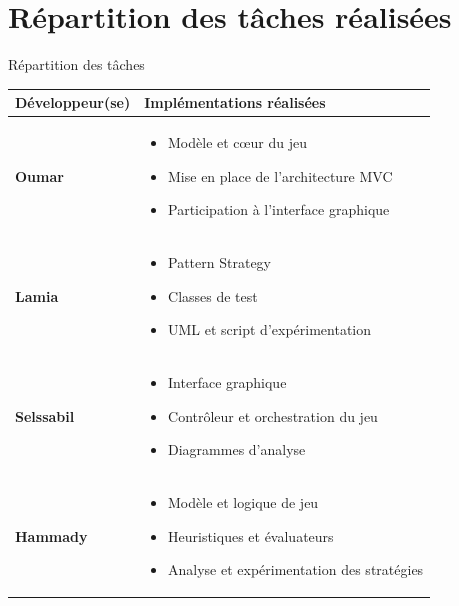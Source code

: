 \documentclass[10pt]{beamer}
\begin{document}
\section{Répartition des tâches réalisées}
\begin{frame}{Répartition des tâches}
\centering
\renewcommand{\arraystretch}{1.3}
\begin{tabular}{|m{3cm}|m{8.2cm}|}
    \hline
    
    \textbf{Développeur(se)} & \textbf{Implémentations réalisées} \\
    \hline
    \textbf{Oumar} &
    \begin{itemize}
        \item Modèle et cœur du jeu
        \item Mise en place de l'architecture MVC
        \item Participation à l'interface graphique
    \end{itemize} \\
    \hline
    \textbf{Lamia} &
    \begin{itemize}
        \item Pattern Strategy
        \item Classes de test
        \item UML et script d'expérimentation
    \end{itemize} \\
    \hline
    \textbf{Selssabil} &
    \begin{itemize}
        \item Interface graphique
        \item Contrôleur et orchestration du jeu
        \item Diagrammes d'analyse
    \end{itemize} \\
    \hline
    \textbf{Hammady} &
    \begin{itemize}
        \item Modèle et logique de jeu
        \item Heuristiques et évaluateurs
        \item Analyse et expérimentation des stratégies
    \end{itemize} \\
    \hline
\end{tabular}
\end{frame}

\end{document}
